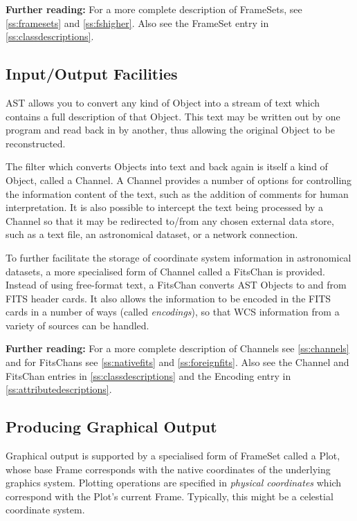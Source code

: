 \documentclass[twoside,11pt]{article}
\newcommand{\htmlref}[2]{#1}
\newcommand{\appref}[1]{Appendix~\ref{#1}}
\newcommand{\secref}[1]{\S\ref{#1}}
\renewcommand{\appref}[1]{\ref{#1}}
\renewcommand{\secref}[1]{\ref{#1}}
\begin{document}
{\bf{Further reading:}} For a more complete description of
FrameSets, see \secref{ss:framesets} and \secref{ss:fshigher}. Also
see the FrameSet entry in \appref{ss:classdescriptions}.

\subsection{Input/Output Facilities}

AST allows you to convert any kind of \htmlref{Object}{Object} into a stream of text
which contains a full description of that Object. This text may be
written out by one program and read back in by another, thus allowing
the original Object to be reconstructed.

The filter which converts Objects into text and back again is itself a
kind of Object, called a \htmlref{Channel}{Channel}. A Channel provides a number of
options for controlling the information content of the text, such as
the addition of comments for human interpretation.  It is also
possible to intercept the text being processed by a Channel so that it
may be redirected to/from any chosen external data store, such as a
text file, an astronomical dataset, or a network connection.

To further facilitate the storage of coordinate system information in
astronomical datasets, a more specialised form of Channel called a
\htmlref{FitsChan}{FitsChan} is provided. Instead of using free-format text, a FitsChan
converts AST Objects to and from FITS header cards. It also allows the
information to be encoded in the FITS cards in a number of ways
(called {\em{encodings}}), so that WCS information from a variety of
sources can be handled.

{\bf{Further reading:}} For a more complete description of Channels
see \secref{ss:channels} and for FitsChans see \secref{ss:nativefits}
and \secref{ss:foreignfits}. Also see the Channel and FitsChan entries
in \appref{ss:classdescriptions} and the \htmlref{Encoding}{Encoding} entry in
\appref{ss:attributedescriptions}.

\subsection{Producing Graphical Output}

Graphical output is supported by a specialised form of \htmlref{FrameSet}{FrameSet} called
a \htmlref{Plot}{Plot}, whose base \htmlref{Frame}{Frame} corresponds with the native coordinates of
the underlying graphics system.  Plotting operations are specified in
{\em{physical coordinates}} which correspond with the Plot's current
Frame. Typically, this might be a celestial coordinate system.
\end{document}
